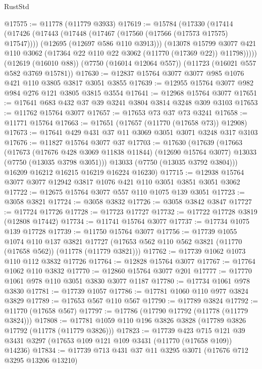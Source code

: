 \begin{lexlean}{RustStd}
\begin{coremodule}
@17575 := @11778 (@11779 @3933)
@17619 := @15784
    (@17330
      (@17414
        (@17426
          (@17443
            (@17448 (@17467 (@17560 (@17566 (@17573 @17575) @17547))))
            (@12695 (@12697 @586 @110 @3913)))
          (@13078
            @15799
            @3077
            @421
            @110
            @3062
            (@17364 @22 @110 @22 @3062 (@11770 (@17369 @22)) @11798)))))
    (@12619 (@16010 @88))
    (@7750 (@16014 @12064 @557))
    (@11723 (@16021 @557 @582 @3769 @15781))
@17630 := @12837 @15764 @3077 @3077 @985 @1076 @421 @110 @3805 @3817 @3051 @3855
@17639 := @12955 @15764 @3077 @982 @984 @276 @121 @3805 @3815 @3554
@17641 := @12968 @15764 @3077
@17651 := @17641 @683 @432 @37 @39 @3241 @3804 @3814 @3248 @309 @3103
@17653 := @11762 @15764 @3077
@17657 := @17653 @73 @37 @73 @3241
@17658 := @11771 @15764
@17663 := @17651 (@17657 (@11770 (@17658 @73)) @12908)
@17673 := @17641 @429 @431 @37 @11 @3069 @3051 @3071 @3248 @317 @3103
@17676 := @11827 @15764 @3077 @37
@17703 := @17630
    (@17639
      (@17663
        (@17673
          (@17676 @428 @3069 @11838 @11844)
          (@12690 @15764 @3077)
          @13033
          (@7750 (@13035 @3798 @3051)))
        @13033
        (@7750 (@13035 @3792 @3804)))
      @16209
      @16212
      @16215
      @16219
      @16224
      @16230)
@17715 := @12938 @15764 @3077 @3077 @12942 @3817 @1076 @421 @110 @3051 @3851 @3051 @3062
@17722 := @12675 @15764 @3077 @557 @110 @1075 @139 @3051
@17723 := @3058 @3821
@17724 := @3058 @3832
@17726 := @3058 @3842 @3847
@17727 := @17724 @17726
@17728 := @17723 @17727
@17732 := @17722 @17728 @3819 (@12808 @17442)
@17734 := @11741 @15764 @3077
@17737 := @17734 @1075 @139 @17728
@17739 := @11750 @15764 @3077
@17756 := @17739
    @1055
    @1074
    @110
    @137
    @3821
    @17727
    (@17653 @562 @110 @562 @3821 (@11770 (@17658 @562)) (@11778 (@11779 @3821)))
@17762 := @17739 @1062 @1073 @110 @112 @3832 @17726
@17764 := @12828 @15764 @3077
@17767 := @17764 @1062 @110 @3832
@17770 := @12860 @15764 @3077 @201
@17777 := @17770 @1061 @978 @110 @3051 @3830 @3077 @1187
@17780 := @17734 @1061 @978 @3830
@17781 := @17739 @1057
@17786 := @17781 @1060 @110 @977 @3824 @3829
@17789 := @17653 @567 @110 @567
@17790 := @17789 @3824
@17792 := @11770 (@17658 @567)
@17797 := @17786 (@17790 @17792 (@11778 (@11779 @3824)))
@17808 := @17781 @1059 @110 @196 @3826 @3828 (@17789 @3826 @17792 (@11778 (@11779 @3826)))
@17823 := @17739
    @423
    @715
    @121
    @39
    @3431
    @3297
    (@17653 @109 @121 @109 @3431 (@11770 (@17658 @109)) @14236)
@17834 := @17739 @713 @431 @37 @11 @3295 @3071 (@17676 @712 @3295 @13206 @13210)

\end{coremodule}
\end{lexlean}
